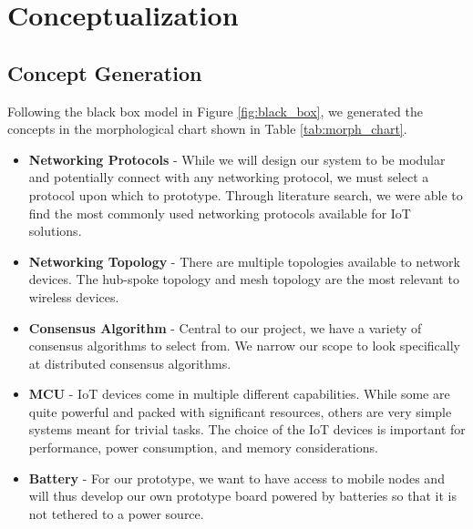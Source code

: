 \section{Conceptualization}
\subsection{Concept Generation}

Following the black box model in Figure \ref{fig:black_box}, we generated the concepts in the morphological chart shown in Table \ref{tab:morph_chart}.

\begin{itemize}
	\item \textbf{Networking Protocols} - While we will design our system to be modular and potentially connect with any networking protocol, we must select a protocol upon which to prototype. Through literature search, we were able to find the most commonly used networking protocols available for IoT solutions.
	\item \textbf{Networking Topology} - There are multiple topologies available to network devices. The hub-spoke topology and mesh topology are the most relevant to wireless devices.
	\item \textbf{Consensus Algorithm} - Central to our project, we have a variety of consensus algorithms to select from. We narrow our scope to look specifically at distributed consensus algorithms. 
	\item \textbf{MCU} - IoT devices come in multiple different capabilities. While some are quite powerful and packed with significant resources, others are very simple systems meant for trivial tasks. The choice of the IoT devices is important for performance, power consumption, and memory considerations.
	\item \textbf{Battery} - For our prototype, we want to have access to mobile nodes and will thus develop our own prototype board powered by batteries so that it is not tethered to a power source.
\end{itemize}


